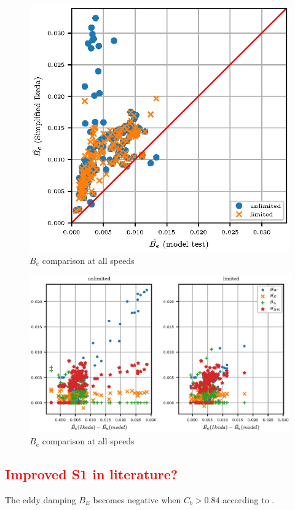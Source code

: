 \begin{figure}[H]
\centering
  \centering
  \includegraphics[width=1.0\columnwidth]{figures/ikeda_limited.eps}
  \caption{$\hat{B_e}$ comparison at all speeds}
  \label{fig:ikeda_limited}
\end{figure}

\begin{figure}[H]
\centering
  \centering
  \includegraphics[width=1.0\columnwidth]{figures/ikeda_components.eps}
  \caption{$\hat{B_e}$ comparison at all speeds}
  \label{fig:ikeda_limited}
\end{figure}



\textcolor{red}{\subsection{Improved S1 in literature?}}
The eddy damping $ B_E $ becomes negative when $ C_b>0.84 $ according to \parencite[]{rudakovic_application_2017}.

